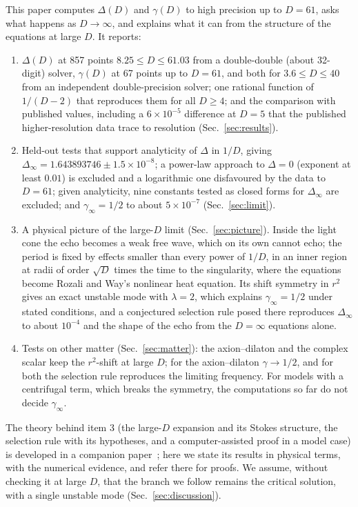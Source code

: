\documentclass[aps,prd,onecolumn,superscriptaddress,nofootinbib,10pt]{revtex4-2}
\newcommand{\Dinf}{\Delta_\infty}
\begin{document}
This paper computes $\Delta(D)$ and $\gamma(D)$ to high precision up to $D = 61$, asks what happens as $D \to \infty$,
and explains what it can from the structure of the equations at large $D$. It reports:
\begin{enumerate}
\item $\Delta(D)$ at 857 points $8.25 \le D \le 61.03$ from a double-double (about 32-digit) solver, $\gamma(D)$ at 67
points up to $D = 61$, and both for $3.6 \le D \le 40$ from an independent double-precision solver; one rational
function of $1/(D-2)$ that reproduces them for all $D \ge 4$; and the comparison with published values, including a
$6\times10^{-5}$ difference at $D = 5$ that the published higher-resolution data trace to resolution
(Sec.~\ref{sec:results}).
\item Held-out tests that support analyticity of $\Delta$ in $1/D$, giving $\Dinf = 1.643893746 \pm 1.5\times10^{-8}$; a
power-law approach to $\Delta = 0$ (exponent at least $0.01$) is excluded and a logarithmic one disfavoured by the data
to $D = 61$; given analyticity, nine constants tested as closed forms for $\Dinf$ are excluded; and $\gamma_\infty = 1/2$
to about $5\times10^{-7}$ (Sec.~\ref{sec:limit}).
\item A physical picture of the large-$D$ limit (Sec.~\ref{sec:picture}). Inside the light cone the echo becomes a weak
free wave, which on its own cannot echo; the period is fixed by effects smaller than every power of $1/D$, in an inner
region at radii of order $\sqrt D$ times the time to the singularity, where the equations become Rozali and Way's
nonlinear heat equation. Its shift symmetry
in $r^2$ gives an exact unstable mode with $\lambda = 2$, which explains $\gamma_\infty = 1/2$ under stated conditions,
and a conjectured selection rule posed there reproduces $\Dinf$ to about $10^{-4}$ and the shape of the echo from the
$D = \infty$ equations alone.
\item Tests on other matter (Sec.~\ref{sec:matter}): the axion--dilaton and the complex scalar keep the $r^2$-shift at
large $D$; for the axion--dilaton $\gamma \to 1/2$, and for both the selection rule reproduces the limiting frequency. For
models with a centrifugal term, which breaks the symmetry, the computations so far do not decide $\gamma_\infty$.
\end{enumerate}
The theory behind item 3 (the large-$D$ expansion and its Stokes structure, the selection rule with its hypotheses, and a
computer-assisted proof in a model case) is developed in a companion paper~\cite{math}; here we state its results in
physical terms, with the numerical evidence, and refer there for proofs. We assume, without checking it at large $D$,
that the branch we follow remains the critical solution, with a single unstable mode (Sec.~\ref{sec:discussion}).
\end{document}
